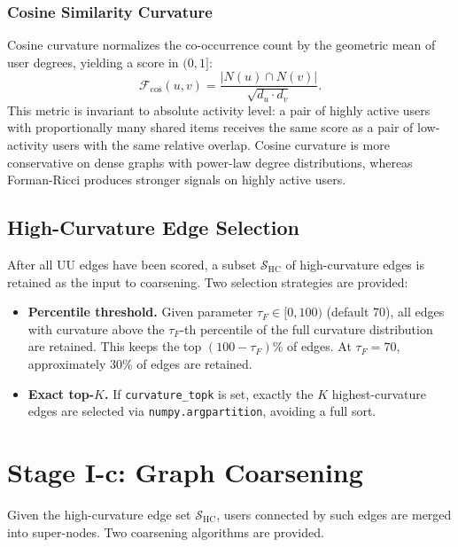 \subsubsection*{Cosine Similarity Curvature}

Cosine curvature normalizes the co-occurrence count by the geometric mean of user degrees, yielding a score in $(0, 1]$:
\begin{equation}
    \mathcal{F}_{\text{cos}}(u,v) = \frac{\bigl|N(u) \cap N(v)\bigr|}{\sqrt{d_u \cdot d_v}}.
    \label{eq:cosine}
\end{equation}
This metric is invariant to absolute activity level: a pair of highly active users with proportionally many shared items receives the same score as a pair of low-activity users with the same relative overlap. Cosine curvature is more conservative on dense graphs with power-law degree distributions, whereas Forman-Ricci produces stronger signals on highly active users.

\subsection{High-Curvature Edge Selection}
\label{sec:hc_selection}

After all UU edges have been scored, a subset $\mathcal{S}_\text{HC}$ of high-curvature edges is retained as the input to coarsening. Two selection strategies are provided:

\begin{itemize}
    \item \textbf{Percentile threshold.} Given parameter $\tau_F \in [0, 100)$ (default 70), all edges with curvature above the $\tau_F$-th percentile of the full curvature distribution are retained. This keeps the top $(100 - \tau_F)\%$ of edges. At $\tau_F = 70$, approximately 30\% of edges are retained.
    \item \textbf{Exact top-$K$.} If \texttt{curvature\_topk} is set, exactly the $K$ highest-curvature edges are selected via \texttt{numpy.argpartition}, avoiding a full sort.
\end{itemize}

\section{Stage I-c: Graph Coarsening}
\label{sec:coarsening}

Given the high-curvature edge set $\mathcal{S}_\text{HC}$, users connected by such edges are merged into super-nodes. Two coarsening algorithms are provided.

